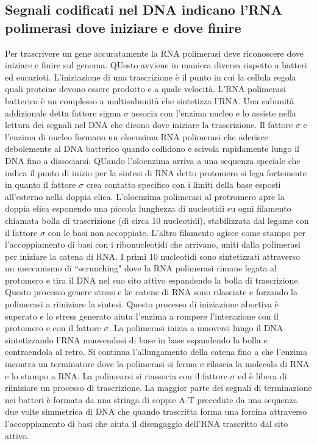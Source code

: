 \subsection{Segnali codificati nel DNA indicano l'RNA polimerasi dove iniziare e dove finire}
Per trascrivere un gene accuratamente la RNA polimerasi deve riconoscere dove iniziare e finire sul genoma. QUesto avviene in maniera diversa rispetto a batteri ed eucarioti. 
L'iniziazione di una trascrizione \`e il punto in cui la cellula regola quali proteine devono essere prodotto e a quale velocit\`a. L'RNA polimerasi batterica \`e un complesso a 
multisubunit\`a che sintetizza l'RNA. Una subunit\`a addizionale detta fattore sigma $\sigma$ associa con l'enzima nucleo e lo assiste nella lettura dei segnali nel DNA che dicono dove
iniziare la trascrizione. Il fattore $\sigma$ e l'enzima di nucleo formano un oloenzima RNA polimerasi che aderisce debolemente al DNA batterico quando collidono e scivola rapidamente 
lungo il DNA fino a dissociarsi. QUando l'oloenzima arriva a una sequenza speciale che indica il punto di inizio per la sintesi di RNA detto protomero si lega fortemente in quanto il 
fattore $\sigma$  crea contatto specifico con i limiti della base esposti all'esterno nella doppia elica. L'oloenzima polimerasi al protromero apre la doppia elica esponendo una piccola
lunghezza di nucleotidi su ogni filamento chiamata bolla di trascrizione (di circa $10$ nucleotidi), stabilizzata dal legame con il fattore $\sigma$ con le basi non accoppiate. L'altro
filamento agisce come stampo per l'accoppiamento di basi con i ribonucleotidi che arrivano, uniti dalla polimerasi per iniziare la catena di RNA. I primi $10$ nucleotidi sono 
sintetizzati attraverso un meccanismo di ``scrunching" dove la RNA polimerasi rimane legata al protomero e tira il DNA nel suo sito attivo espandendo la bolla di trascrizione. Questo
processo genere stress e ke catene di RNA sono rilasciate e forzando la polimerasi a riiniziare la sintesi. Questo processo di iniziazione abortiva \`e superato e lo stress generato 
aiuta l'enzima a rompere l'interazione con il protomero e con il fattore $\sigma$. La polimerasi inizia a muoversi lungo il DNA sintetizzando l'RNA muovendosi di base in base espandendo
la bolla e contraendola al retro. Si continua l'allungamento della catena fino a che l'enzima incontra un terminatore dove la polimerasi si ferma e rilascia la molecola di RNA e lo 
stampo a RNA. La polimearsi si riassocia con il fattore $\sigma$ ed \`e libera di riiniziare un processo di trascrizione. La maggior parte dei segnali di terminazione nei batteri \`e
formata da una stringa di coppie A-T precedute da una sequenza due volte simmetrica  di DNA che quando trascritta forma una forcina attraverso l'accoppiamento di basi che aiuta il 
disengaggio dell'RNA trascritto dal sito attivo.
